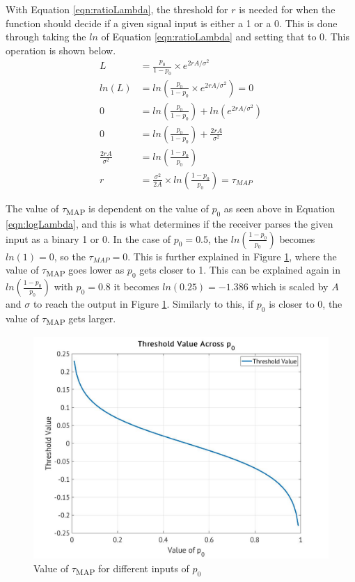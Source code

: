\documentclass[a4paper, 11pt]{article}
\begin{document}
\pagebreak
With Equation \ref{eqn:ratioLambda}, the threshold for \(r\) is needed for when the function should decide if a given signal input is either a 1 or a 0. This is done through taking the \(ln\) of Equation \ref{eqn:ratioLambda} and setting that to 0. This operation is shown below.
\begin{align}
\label{eqn:logLambda}
    L     &= \frac{p_0}{1-p_0} \times e^{2rA/\sigma^2}\nonumber \\
    ln(L) &= ln\left(\frac{p_0}{1-p_0} \times e^{2rA/\sigma^2}\right)=0\nonumber \\
    0 &= ln\left(\frac{p_0}{1-p_0}\right) + ln\left(e^{2rA/\sigma^2}\right)\nonumber \\
    0 &= ln\left(\frac{p_0}{1-p_0}\right) + \frac{2rA}{\sigma^2}\nonumber \\
    \frac{2rA}{\sigma^2} &= ln\left(\frac{1-p_0}{p_0}\right)\nonumber \\
    r &= \frac{\sigma^2}{2A} \times ln\left(\frac{1-p_0}{p_0}\right) = \displaystyle\tau_{MAP}
\end{align}


The value of \(\tau\)\textsubscript{MAP} is dependent on the value of \(p_0\) as seen above in Equation \ref{eqn:logLambda}, and this is what determines if the receiver parses the given input as a binary 1 or 0. In the case of \(p_0 = 0.5\), the \(ln\left(\frac{1-p_0}{p_0}\right)\) becomes \(ln(1)=0\), so the \(\tau_{MAP} = 0\). This is further explained in Figure \ref{fig:tauCurve}, where the value of \(\tau\)\textsubscript{MAP} goes lower as \(p_0\) gets closer to 1.
This can be explained again in \(ln\left(\frac{1-p_0}{p_0}\right)\) with \(p_0 = 0.8\) it becomes \(ln(0.25) = -1.386\) which is scaled by \(A\) and \(\sigma\) to reach the output in Figure \ref{fig:tauCurve}. Similarly to this, if \(p_0\) is closer to 0, the value of \(\tau\)\textsubscript{MAP} gets larger.

\pagebreak
\begin{figure}[htbp]
\centering
\includegraphics[width=.9\linewidth]{./Images/figure2_1.jpg}
\caption{\label{fig:tauCurve}Value of \(\tau\)\textsubscript{MAP} for different inputs of \(p_0\)}
\end{figure}
\end{document}
